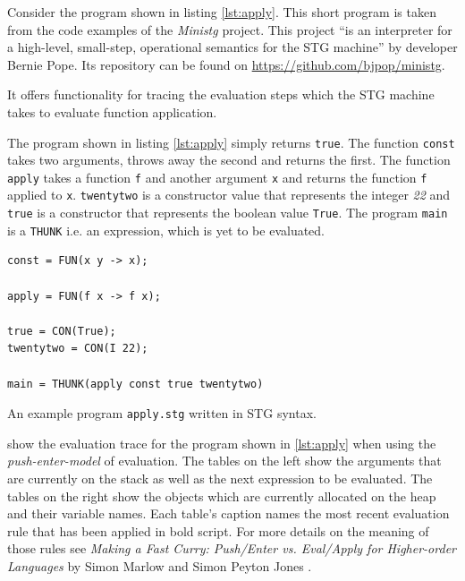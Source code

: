 \documentclass[runningheads]{llncs}
\begin{document}
Consider the program shown in listing \ref{lst:apply}. This short program is taken from the code examples of the \textit{Ministg} project. This project \enquote{is an interpreter for a high-level, small-step, operational semantics for the STG machine} by developer Bernie Pope. Its repository can be found on \url{https://github.com/bjpop/ministg}.

It offers functionality for tracing the evaluation steps which the STG machine takes to evaluate function application.

The program shown in listing \ref{lst:apply} simply returns \texttt{true}. The function \texttt{const} takes two arguments, throws away the second and returns the first. The function \texttt{apply} takes a function \texttt{f} and another argument \texttt{x} and returns the function \texttt{f} applied to \texttt{x}. \texttt{twentytwo} is a constructor value that represents the integer \textit{22} and \texttt{true} is a constructor that represents the boolean value \texttt{True}. The program \texttt{main} is a \texttt{THUNK} i.e. an expression, which is yet to be evaluated.

\begin{listing}[H]
\begin{verbatim}
const = FUN(x y -> x);

apply = FUN(f x -> f x);
 
true = CON(True);
twentytwo = CON(I 22);

main = THUNK(apply const true twentytwo)

\end{verbatim}
\caption{An example program \texttt{apply.stg} written in STG syntax.}
\label{lst:apply}
\end{listing}

 show the evaluation trace for the program shown in \cref{lst:apply} when using the \textit{push-enter-model} of evaluation.
The tables on the left show the arguments that are currently on the stack as well as the next expression to be evaluated. The tables on the right show the objects which are currently allocated on the heap and their variable names. Each table's caption names the most recent evaluation rule that has been applied in bold script. For more details on the meaning of those rules see \textit{Making a Fast Curry: Push/Enter vs. Eval/Apply for Higher-order Languages} by Simon Marlow and Simon Peyton Jones \cite{marlow2004making}.
\end{document}
